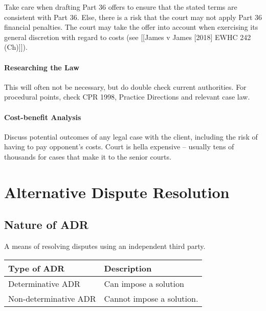 \documentclass[
]{article}
\begin{document}
Take care when drafting Part 36 offers to ensure that the stated terms
are consistent with Part 36. Else, there is a risk that the court may
not apply Part 36 financial penalties. The court may take the offer into
account when exercising its general discretion with regard to costs (see
{[}{[}James v James {[}2018{]} EWHC 242 (Ch){]}{]}).

\hypertarget{researching-the-law}{%
\paragraph{Researching the Law}\label{researching-the-law}}

This will often not be necessary, but do double check current
authorities. For procedural points, check CPR 1998, Practice Directions
and relevant case law.

\hypertarget{cost-benefit-analysis}{%
\paragraph{Cost-benefit Analysis}\label{cost-benefit-analysis}}

Discuss potential outcomes of any legal case with the client, including
the risk of having to pay opponent's costs. Court is hella expensive --
usually tens of thousands for cases that make it to the senior courts.

\hypertarget{alternative-dispute-resolution-1}{%
\section{Alternative Dispute
Resolution}\label{alternative-dispute-resolution-1}}

\hypertarget{nature-of-adr}{%
\subsection{Nature of ADR}\label{nature-of-adr}}

A means of resolving disputes using an independent third party.

\begin{longtable}[]{@{}ll@{}}
\toprule()
Type of ADR & Description \\
\midrule()
\endhead
Determinative ADR & Can impose a solution \\
Non-determinative ADR & Cannot impose a solution. \\
\bottomrule()
\end{longtable}
\end{document}
